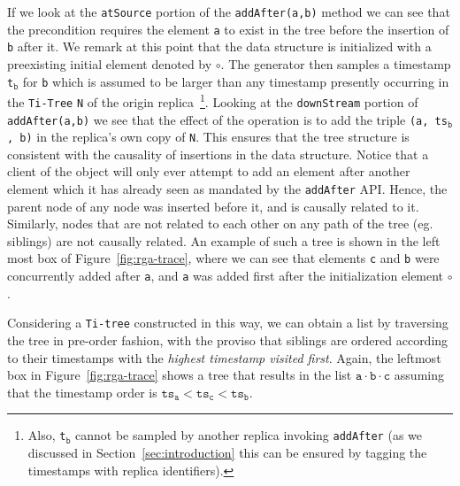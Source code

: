If we look at the \lstinline|atSource| portion of the
\lstinline|addAfter(a,b)| method we can see that the precondition requires
the element \lstinline|a| to exist in the tree before the insertion of
\lstinline|b| after it.
%
We remark at this point that the data structure is initialized with a
preexisting initial element denoted by $\circ$.
%
The generator then samples a timestamp \lstinline|t|$_{\mathtt{b}}$
for \lstinline|b| which is assumed to be larger than any
timestamp presently occurring in the \lstinline|Ti-Tree|
\lstinline|N| of the origin replica~\footnote{Also, \lstinline|t|$_{\mathtt{b}}$ cannot 
be sampled by another replica invoking \lstinline|addAfter| (as we discussed
in Section~\ref{sec:introduction} this can be ensured by tagging the timestamps with replica identifiers).}.
%
Looking at the \lstinline|downStream| portion of
\lstinline|addAfter(a,b)| we see that the effect of the operation is
to add the triple \lstinline|(a, ts|$_{\mathtt{b}}$\lstinline|, b)|
in the replica's own copy of \lstinline|N|.
%
This ensures that the tree structure is consistent with the causality
of insertions in the data structure.
%
Notice that a client of the object will only ever attempt to add an
element after another element which it has already seen as mandated by
the \lstinline|addAfter| API.
%
Hence, the parent node of any node was inserted before it, and is
causally related to it.
%
Similarly, nodes that are not related to each other on any path of
the tree (eg. siblings) are not causally related.
%
An example of such a tree is shown in the left most box
of Figure~\ref{fig:rga-trace}, where we can see that
elements \lstinline|c| and \lstinline|b| were concurrently added after
\lstinline|a|, and \lstinline|a| was added first after the
initialization element $\circ$.

Considering a \lstinline|Ti-tree| constructed in this way, we can
obtain a list by traversing the tree in pre-order fashion, with the
proviso that siblings are ordered according to their timestamps with
the \emph{highest timestamp visited first}.
%
Again, the leftmost box in Figure~\ref{fig:rga-trace} shows a tree that
results in the list $\mathtt{a \cdot b \cdot c}$ assuming that the
timestamp order is $\mathtt{ts_a < ts_c < ts_b}$.

